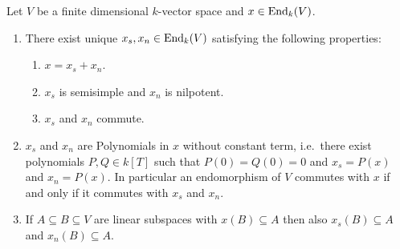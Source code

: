 \begin{thrm}\label{thrm: concrete Jordan decomposition}
 Let $V$ be a finite dimensional $k$-vector space and $x \in \operatorname{End}_k(V)$.
 \begin{enumerate}[leftmargin=*]
  \item
   There exist unique $x_s, x_n \in \operatorname{End}_k(V)$ satisfying the following properties:
   \begin{enumerate}
    \item
     $x = x_s + x_n$.
    \item
     $x_s$ is semisimple and $x_n$ is nilpotent.
    \item
     $x_s$ and $x_n$ commute.
   \end{enumerate}
  \item
   $x_s$ and $x_n$ are Polynomials in $x$ without constant term, i.e.\ there exist polynomials $P,Q \in k[T]$ such that $P(0) = Q(0) = 0$ and $x_s = P(x)$ and $x_n = P(x)$. In particular an endomorphism of $V$ commutes with $x$ if and only if it commutes with $x_s$ and $x_n$.
  \item
   If $A \subseteq B \subseteq V$ are linear subspaces with $x(B) \subseteq A$ then also $x_s(B) \subseteq A$ and $x_n(B) \subseteq A$.
 \end{enumerate}
\end{thrm}
